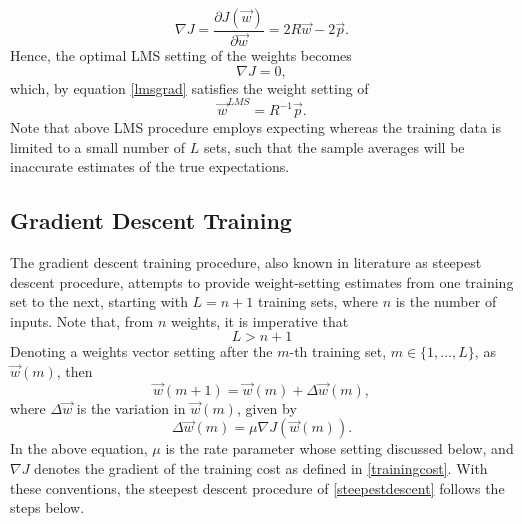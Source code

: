 \documentclass[%
    corpo=11pt,
    twoside,
    stile=classica,
    oldstyle,
    autoretitolo,
    tipotesi=magistrale,
    greek,
    evenboxes,
    english
]{toptesi}
\begin{document}
\begin{equation}
\label{lmsgrad}
\nabla J = \frac{\partial J(\vec{w})}{\partial \vec{w}} = 2R\vec{w} - 2\vec{p}.
\end{equation}
Hence, the optimal LMS setting of the weights becomes
\begin{equation}
\nabla J = 0,
\end{equation}
which, by equation \eqref{lmsgrad} satisfies the weight setting of 
\begin{equation}
\vec{w}^{LMS} = R^{-1}\vec{p}.
\end{equation}
Note that above LMS procedure employs expecting whereas the training data is limited to a small number of $L$ sets, such that the sample averages will be inaccurate estimates of the true expectations. 

\subsection{Gradient Descent Training}
\label{gdtsection}
The gradient descent training procedure, also known in literature as steepest descent procedure, attempts to provide weight-setting estimates from one training set to the next, starting with $L=n+1$ training sets, where $n$ is the number of inputs. Note that, from $n$ weights, it is imperative that 
\begin{equation}
L > n + 1
\end{equation}
Denoting a weights vector setting after the $m$-th training set, $m \in \{1, \dots, L\}$, as $\vec{w}(m)$, then 
\begin{equation}
\label{steepestdescent}
\vec{w}(m+1) = \vec{w}(m) + \Delta\vec{w}(m),
\end{equation}
where $\Delta\vec{w}$ is the variation in $\vec{w}(m)$, given by
\begin{equation}
\label{variation}
\Delta\vec{w}(m) = \mu \nabla J\left(\vec{w}(m)\right).
\end{equation}
In the above equation, $\mu$ is the rate parameter whose setting discussed below, and $\nabla J$ denotes the gradient of the training cost as defined in \eqref{trainingcost}. With these conventions, the steepest descent procedure of \eqref{steepestdescent} follows the steps below.
\end{document}
